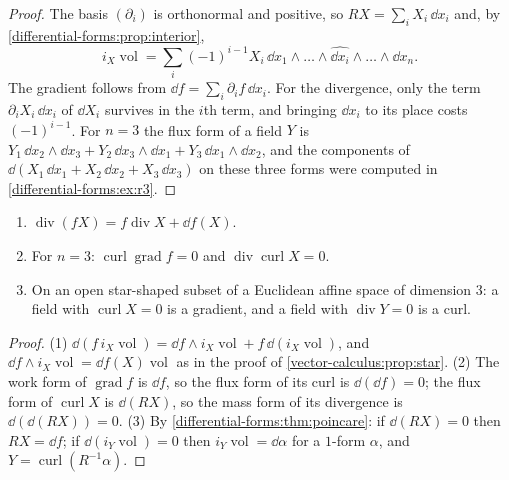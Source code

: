 \begin{notechapter}
\begin{proof}
The basis $(\partial_i)$ is orthonormal and positive, so
$RX = \sum_iX_i\,\dd x_i$ and, by
\cref{differential-forms:prop:interior},
\[
  i_X\operatorname{vol} = \sum_i(-1)^{i-1}X_i\,
  \dd x_1\wedge\dots\wedge\widehat{\dd x_i}\wedge\dots\wedge\dd x_n .
\]
The gradient follows from
$\dd f = \sum_i\partial_if\,\dd x_i$. For the divergence, only the term
$\partial_iX_i\,\dd x_i$ of $\dd X_i$ survives in the $i$th term, and
bringing $\dd x_i$ to its place costs $(-1)^{i-1}$. For $n = 3$ the
flux form of a field $Y$ is
$Y_1\,\dd x_2\wedge\dd x_3 + Y_2\,\dd x_3\wedge\dd x_1
+ Y_3\,\dd x_1\wedge\dd x_2$, and the components of
$\dd(X_1\,\dd x_1 + X_2\,\dd x_2 + X_3\,\dd x_3)$ on these three forms
were computed in \cref{differential-forms:ex:r3}.
\end{proof}

\begin{proposition}
\label{vector-calculus:prop:identities}
\begin{enumerate}[nosep]
  \item $\operatorname{div}(fX)
        = f\operatorname{div}X + \dd f(X)$.
  \item For $n = 3$: $\operatorname{curl}\operatorname{grad}f = 0$ and
        $\operatorname{div}\operatorname{curl}X = 0$.
  \item On an open star-shaped subset of a Euclidean affine space of
        dimension $3$: a field with $\operatorname{curl}X = 0$ is a
        gradient, and a field with $\operatorname{div}Y = 0$ is a
        curl.
\end{enumerate}
\end{proposition}

\begin{proof}
(1) $\dd(f\,i_X\operatorname{vol})
= \dd f\wedge i_X\operatorname{vol} + f\,\dd(i_X\operatorname{vol})$,
and $\dd f\wedge i_X\operatorname{vol} = \dd f(X)\operatorname{vol}$
as in the proof of \cref{vector-calculus:prop:star}. (2) The work form
of $\operatorname{grad}f$ is $\dd f$, so the flux form of its curl is
$\dd(\dd f) = 0$; the flux form of $\operatorname{curl}X$ is
$\dd(RX)$, so the mass form of its divergence is $\dd(\dd(RX)) = 0$.
(3) By \cref{differential-forms:thm:poincare}: if
$\dd(RX) = 0$ then $RX = \dd f$; if
$\dd(i_Y\operatorname{vol}) = 0$ then
$i_Y\operatorname{vol} = \dd\alpha$ for a $1$-form $\alpha$, and
$Y = \operatorname{curl}(R^{-1}\alpha)$.
\end{proof}


\end{notechapter}
